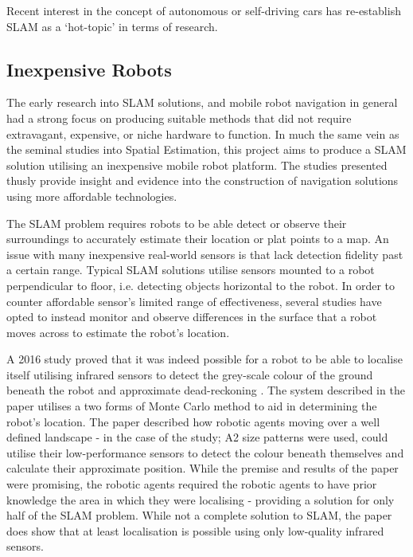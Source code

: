 Recent interest in the concept of autonomous or self-driving cars has
re-establish SLAM as a `hot-topic' in terms of research.



\subsection{Inexpensive Robots}
The early research into SLAM solutions, and mobile robot navigation in general
had a strong focus on producing suitable methods that did not require
extravagant, expensive, or niche hardware to function.
In much the same vein as the seminal studies into Spatial Estimation, this
project aims to produce a SLAM solution utilising an inexpensive mobile
robot platform.
The studies presented thusly provide insight and evidence into the
construction of navigation solutions using more affordable technologies.

The SLAM problem requires robots to be able detect or observe their
surroundings to accurately estimate their location or plat points to a map.
An issue with many inexpensive real-world sensors is that lack detection
fidelity past a certain range.
Typical SLAM solutions utilise sensors mounted to a robot perpendicular to
floor, i.e. detecting objects horizontal to the robot.
In order to counter affordable sensor's limited range of effectiveness, several
studies have opted to instead monitor and observe differences in the surface
that a robot moves across to estimate the robot's location.

A 2016 study proved that it was indeed possible for a robot to be able to
localise itself utilising infrared sensors to detect the grey-scale colour of
the ground beneath the robot and approximate dead-reckoning \cite{Wang2016}.
The system described in the paper utilises a two forms of  Monte Carlo
method to aid in determining the robot's location.
The paper described how robotic agents moving over a well defined landscape -
in the case of the study; A2 size patterns were used, could utilise
their low-performance sensors to detect the colour beneath themselves and
calculate their approximate position.
While the premise and results of the paper were promising, the robotic agents
required the robotic agents to have prior knowledge the area in which they
were localising - providing a solution for only half of the SLAM problem.
While not a complete solution to SLAM, the paper does show that at least
localisation is possible using only low-quality infrared sensors.

